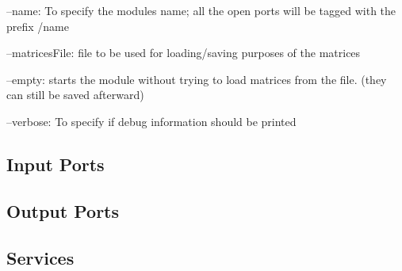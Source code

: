 \begin{DoxyItemize}
\item --name\+: To specify the module\textquotesingle{}s name; all the open ports will be tagged with the prefix /name
\item --matrices\+File\+: file to be used for loading/saving purposes of the matrices
\item --empty\+: starts the module without trying to load matrices from the file. (they can still be saved afterward)
\item --verbose\+: To specify if debug information should be printed 
\end{DoxyItemize}\hypertarget{group__touchDetector_inputports_sec}{}\subsection{Input Ports}\label{group__touchDetector_inputports_sec}
\hypertarget{group__touchDetector_outputports_sec}{}\subsection{Output Ports}\label{group__touchDetector_outputports_sec}
\hypertarget{group__touchDetector_services_sec}{}\subsection{Services}\label{group__touchDetector_services_sec}

